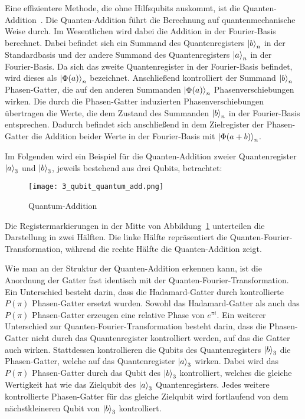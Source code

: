 Eine effizientere Methode, die ohne Hilfsqubits auskommt, ist die Quanten-Addition~\cite{draper2000addition}. 
Die Quanten-Addition führt die Berechnung auf quantenmechanische Weise durch. 
Im Wesentlichen wird dabei die Addition in der Fourier-Basis berechnet. 
Dabei befindet sich ein Summand des Quantenregisters \(\ket{b}_n\) in der Standardbasis und 
der andere Summand des Quantenregisters \(\ket{a}_n\) in der Fourier-Basis.
Da sich das zweite Quantenregister in der Fourier-Basis befindet, 
wird dieses als \(\ket{\Phi(a)}_n\) bezeichnet.
Anschließend kontrolliert der Summand \(\ket{b}_n\) Phasen-Gatter, 
die auf den anderen Summanden \(\ket{\Phi(a)}_n\) Phasenverschiebungen wirken.
Die durch die Phasen-Gatter induzierten Phasenverschiebungen übertragen die Werte, 
die dem Zustand des Summanden \(\ket{b}_n\) in der Fourier-Basis entsprechen.
Dadurch befindet sich anschließend in dem Zielregister der Phasen-Gatter die Addition beider Werte in der Fourier-Basis mit \(\ket{\Phi(a+b)}_n\).

Im Folgenden wird ein Beispiel für die Quanten-Addition zweier Quantenregister \(\ket{a}_3\) und \(\ket{b}_3\), 
jeweils bestehend aus drei Qubits, betrachtet:
\begin{figure}[H]
    \caption{Quantum-Addition}
    \label{fig:3_qubit_quantum_add}
    \texttt{[image: 3\_qubit\_quantum\_add.png]}
    \centering
    \end{figure}
Die Registermarkierungen in der Mitte von Abbildung~\ref{fig:3_qubit_quantum_add} unterteilen die Darstellung in zwei Hälften.
Die linke Hälfte repräsentiert die Quanten-Fourier-Transformation, 
während die rechte Hälfte die Quanten-Addition zeigt.

Wie man an der Struktur der Quanten-Addition erkennen kann,
ist die Anordnung der Gatter fast identisch mit der Quanten-Fourier-Transformation.
Ein Unterschied besteht darin, 
dass die Hadamard-Gatter durch kontrollierte \(P(\pi)\) Phasen-Gatter ersetzt wurden.
Sowohl das Hadamard-Gatter als auch das \(P(\pi)\) Phasen-Gatter erzeugen eine relative Phase von \(e^{\pi i}\).
Ein weiterer Unterschied zur Quanten-Fourier-Transformation besteht darin, 
dass die Phasen-Gatter nicht durch das Quantenregister kontrolliert werden, 
auf das die Gatter auch wirken.
Stattdessen kontrollieren die Qubits des Quantenregisters \(\ket{b}_3\) die Phasen-Gatter, 
welche auf das Quantenregister \(\ket{a}_3\) wirken.
Dabei wird das \(P(\pi)\) Phasen-Gatter durch das Qubit des \(\ket{b}_3\) kontrolliert,
welches die gleiche Wertigkeit hat wie das Zielqubit des \(\ket{a}_3\) Quantenregisters.
Jedes weitere kontrollierte Phasen-Gatter für das gleiche Zielqubit 
wird fortlaufend von dem nächstkleineren Qubit von \(\ket{b}_3\) kontrolliert.

